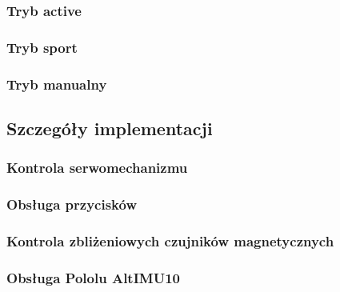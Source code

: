 \subsubsection{Tryb active}
\subsubsection{Tryb sport}  
 


\subsubsection{Tryb manualny}

\subsection{Szczegóły implementacji}


\subsubsection{Kontrola serwomechanizmu}
\subsubsection{Obsługa przycisków}
\subsubsection{Kontrola zbliżeniowych czujników magnetycznych}
\subsubsection{Obsługa Pololu AltIMU10}




